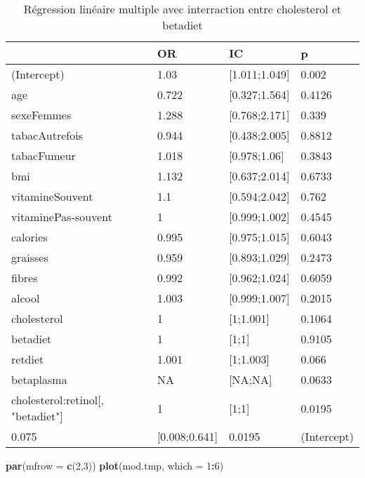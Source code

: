 \documentclass[]{article}
\newenvironment{Shaded}{\begin{snugshade}}{\end{snugshade}}
\newcommand{\KeywordTok}[1]{\textcolor[rgb]{0.13,0.29,0.53}{\textbf{#1}}}
\newcommand{\DataTypeTok}[1]{\textcolor[rgb]{0.13,0.29,0.53}{#1}}
\newcommand{\DecValTok}[1]{\textcolor[rgb]{0.00,0.00,0.81}{#1}}
\newcommand{\OperatorTok}[1]{\textcolor[rgb]{0.81,0.36,0.00}{\textbf{#1}}}
\newcommand{\NormalTok}[1]{#1}
\begin{document}
\begin{table}

\caption{\label{tab:unnamed-chunk-92}Régression linéaire multiple avec interraction entre cholesterol et betadiet}
\centering
\begin{tabular}[t]{l|l|l|l}
\hline
  & OR & IC & p\\
\hline
\rowcolor[HTML]{BBD2E1}  (Intercept) & 1.03 & [1.011;1.049] & 0.002\\
\hline
age & 0.722 & [0.327;1.564] & 0.4126\\
\hline
\rowcolor[HTML]{BBD2E1}  sexeFemmes & 1.288 & [0.768;2.171] & 0.339\\
\hline
tabacAutrefois & 0.944 & [0.438;2.005] & 0.8812\\
\hline
\rowcolor[HTML]{BBD2E1}  tabacFumeur & 1.018 & [0.978;1.06] & 0.3843\\
\hline
bmi & 1.132 & [0.637;2.014] & 0.6733\\
\hline
\rowcolor[HTML]{BBD2E1}  vitamineSouvent & 1.1 & [0.594;2.042] & 0.762\\
\hline
vitaminePas-souvent & 1 & [0.999;1.002] & 0.4545\\
\hline
\rowcolor[HTML]{BBD2E1}  calories & 0.995 & [0.975;1.015] & 0.6043\\
\hline
graisses & 0.959 & [0.893;1.029] & 0.2473\\
\hline
\rowcolor[HTML]{BBD2E1}  fibres & 0.992 & [0.962;1.024] & 0.6059\\
\hline
alcool & 1.003 & [0.999;1.007] & 0.2015\\
\hline
\rowcolor[HTML]{BBD2E1}  cholesterol & 1 & [1;1.001] & 0.1064\\
\hline
betadiet & 1 & [1;1] & 0.9105\\
\hline
\rowcolor[HTML]{BBD2E1}  retdiet & 1.001 & [1;1.003] & 0.066\\
\hline
betaplasma & NA & [NA;NA] & 0.0633\\
\hline
\rowcolor[HTML]{BBD2E1}  cholesterol:retinol[, "betadiet"] & 1 & [1;1] & 0.0195\\
\hline
0.075 & [0.008;0.641] & 0.0195 & (Intercept)\\
\hline
\end{tabular}
\end{table}

\begin{Shaded}
\begin{Highlighting}[]
\KeywordTok{par}\NormalTok{(}\DataTypeTok{mfrow =} \KeywordTok{c}\NormalTok{(}\DecValTok{2}\NormalTok{,}\DecValTok{3}\NormalTok{))}
\KeywordTok{plot}\NormalTok{(mod.tmp, }\DataTypeTok{which =} \DecValTok{1}\OperatorTok{:}\DecValTok{6}\NormalTok{)}
\end{Highlighting}
\end{Shaded}
\end{document}
